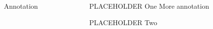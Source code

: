 \documentclass[final,t]{beamer}
\begin{document}
\begin{frame}{}
\begin{columns}[t]
\begin{column}{.33\linewidth}
\begin{block}{Annotation}
\begin{center}
\begin{minipage}{.85\textwidth}
\end{minipage}
\end{center}
\vspace{-.5em}
\end{block}

\end{column}

\begin{column}{.33\linewidth}
\vspace{-1em}
\begin{block}{PLACEHOLDER One}
More annotation
\end{block}

\begin{block}{PLACEHOLDER Two}


\end{block}

\end{column}


\end{columns}
\end{frame}
\end{document}

